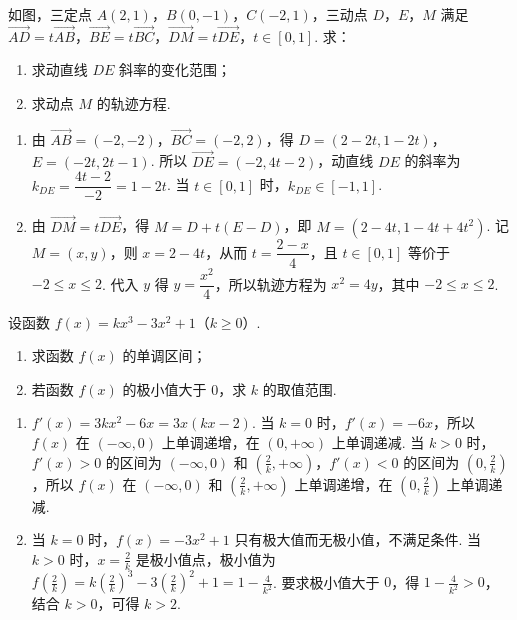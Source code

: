 \begin{problem}
如图，三定点 \(A(2,1)\)，\(B(0,-1)\)，\(C(-2,1)\)，三动点 \(D\)，\(E\)，\(M\) 满足 \(\overrightarrow{AD} = t\overrightarrow{AB}\)，\(\overrightarrow{BE} = t\overrightarrow{BC}\)，\(\overrightarrow{DM} = t\overrightarrow{DE}\)，\(t \in [0,1]\). 求：

\begin{enumerate}
\item 求动直线 \(DE\) 斜率的变化范围；
\item 求动点 \(M\) 的轨迹方程.
\end{enumerate}

\end{problem}

\begin{solution}
\begin{enumerate}
\item 由 \(\overrightarrow{AB}=(-2,-2)\)，\(\overrightarrow{BC}=(-2,2)\)，得 \(D=(2-2t,1-2t)\)，\(E=(-2t,2t-1)\). 所以 \(\overrightarrow{DE}=(-2,4t-2)\)，动直线 \(DE\) 的斜率为 \(k_{DE}=\dfrac{4t-2}{-2}=1-2t\). 当 \(t\in[0,1]\) 时，\(k_{DE}\in[-1,1]\).
\item 由 \(\overrightarrow{DM}=t\overrightarrow{DE}\)，得 \(M=D+t(E-D)\)，即 \(M=(2-4t,1-4t+4t^{2})\). 记 \(M=(x,y)\)，则 \(x=2-4t\)，从而 \(t=\dfrac{2-x}{4}\)，且 \(t\in[0,1]\) 等价于 \(-2\leqslant x\leqslant2\). 代入 \(y\) 得 \(y=\dfrac{x^{2}}{4}\)，所以轨迹方程为 \(x^{2}=4y\)，其中 \(-2\leqslant x\leqslant2\).
\end{enumerate}
\end{solution}

\begin{problem}
设函数 \( f(x) = kx^{3} - 3x^{2} + 1 \)（\(k \geqslant 0\)）.

\begin{enumerate}
\item 求函数 \( f(x) \) 的单调区间；
\item 若函数 \( f(x) \) 的极小值大于 0，求 \(k\) 的取值范围.
\end{enumerate}
\end{problem}

\begin{solution}
\begin{enumerate}
\item \(f'(x)=3kx^{2}-6x=3x(kx-2)\). 当 \(k=0\) 时，\(f'(x)=-6x\)，所以 \(f(x)\) 在 \((-\infty,0)\) 上单调递增，在 \((0,+\infty)\) 上单调递减. 当 \(k>0\) 时，\(f'(x)>0\) 的区间为 \((-\infty,0)\) 和 \((\frac{2}{k},+\infty)\)，\(f'(x)<0\) 的区间为 \((0,\frac{2}{k})\)，所以 \(f(x)\) 在 \((-\infty,0)\) 和 \((\frac{2}{k},+\infty)\) 上单调递增，在 \((0,\frac{2}{k})\) 上单调递减.
\item 当 \(k=0\) 时，\(f(x)=-3x^{2}+1\) 只有极大值而无极小值，不满足条件. 当 \(k>0\) 时，\(x=\frac{2}{k}\) 是极小值点，极小值为 \(f\left(\frac{2}{k}\right)=k\left(\frac{2}{k}\right)^{3}-3\left(\frac{2}{k}\right)^{2}+1=1-\frac{4}{k^{2}}\). 要求极小值大于 \(0\)，得 \(1-\frac{4}{k^{2}}>0\)，结合 \(k>0\)，可得 \(k>2\).
\end{enumerate}
\end{solution}
